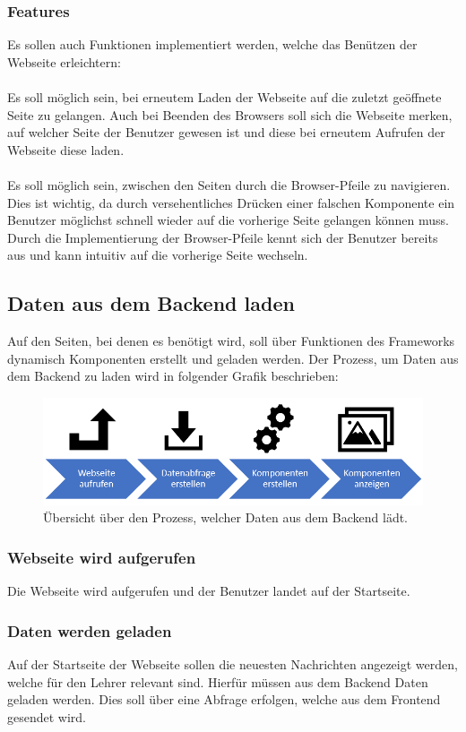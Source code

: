 \subsubsection{Features}
Es sollen auch Funktionen implementiert werden, welche das Benützen der Webseite erleichtern:
\\\\
Es soll möglich sein, bei erneutem Laden der Webseite auf die zuletzt geöffnete Seite zu gelangen. Auch bei Beenden des Browsers soll sich die Webseite merken, auf welcher Seite der Benutzer gewesen ist und diese bei erneutem Aufrufen der Webseite diese laden.
\\\\
Es soll möglich sein, zwischen den Seiten durch die Browser-Pfeile zu navigieren. Dies ist wichtig, da durch versehentliches Drücken einer falschen Komponente ein Benutzer möglichst schnell wieder auf die vorherige Seite gelangen können muss. Durch die Implementierung der Browser-Pfeile kennt sich der Benutzer bereits aus und kann intuitiv auf die vorherige Seite wechseln.
\newpage
\subsection{Daten aus dem Backend laden}
Auf den Seiten, bei denen es benötigt wird, soll über Funktionen des Frameworks dynamisch Komponenten erstellt und geladen werden. Der Prozess, um Daten aus dem Backend zu laden wird in folgender Grafik beschrieben:
\begin{figure}[H]
	\centering
	\includegraphics[width=0.8\linewidth]{images/Prozess_Daten_laden}
	\caption[Prozess der Daten zur Anzeige]{Übersicht über den Prozess, welcher Daten aus dem Backend lädt.}
	\label{fig:prozessdatenladen}
\end{figure}

\subsubsection{Webseite wird aufgerufen}
Die Webseite wird aufgerufen und der Benutzer landet auf der Startseite.

\subsubsection{Daten werden geladen}
Auf der Startseite der Webseite sollen die neuesten Nachrichten angezeigt werden, welche für den Lehrer relevant sind. Hierfür müssen aus dem Backend Daten geladen werden. Dies soll über eine Abfrage erfolgen, welche aus dem Frontend gesendet wird.

